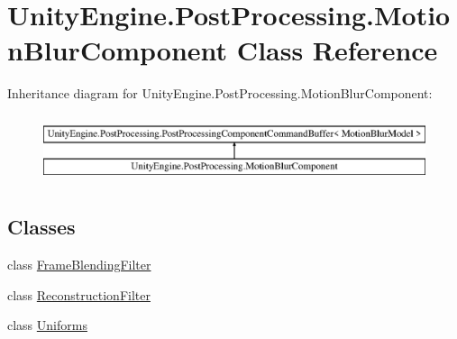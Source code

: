 \hypertarget{class_unity_engine_1_1_post_processing_1_1_motion_blur_component}{}\section{Unity\+Engine.\+Post\+Processing.\+Motion\+Blur\+Component Class Reference}
\label{class_unity_engine_1_1_post_processing_1_1_motion_blur_component}
Inheritance diagram for Unity\+Engine.\+Post\+Processing.\+Motion\+Blur\+Component\+:\begin{figure}[H]
\begin{center}
\leavevmode
\includegraphics[height=2.000000cm]{class_unity_engine_1_1_post_processing_1_1_motion_blur_component}
\end{center}
\end{figure}
\subsection*{Classes}
\begin{DoxyCompactItemize}
\item 
class \hyperlink{class_unity_engine_1_1_post_processing_1_1_motion_blur_component_1_1_frame_blending_filter}{Frame\+Blending\+Filter}
\item 
class \hyperlink{class_unity_engine_1_1_post_processing_1_1_motion_blur_component_1_1_reconstruction_filter}{Reconstruction\+Filter}
\item 
class \hyperlink{class_unity_engine_1_1_post_processing_1_1_motion_blur_component_1_1_uniforms}{Uniforms}
\end{DoxyCompactItemize}
